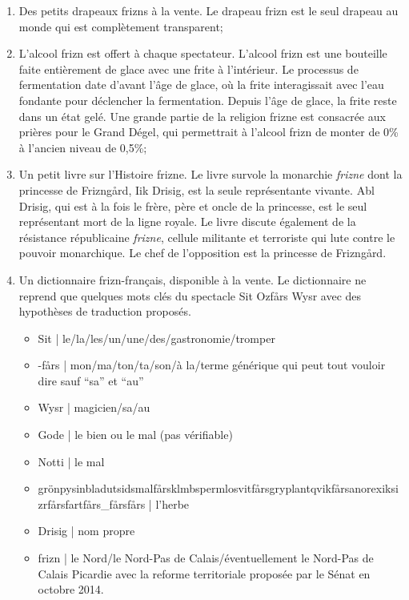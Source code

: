 \documentclass[a4paper]{article}
\begin{document}
\begin{enumerate}
\item Des petits drapeaux frizns à la vente. Le drapeau frizn est le seul
drapeau au monde qui est complètement transparent;
\item L’alcool frizn est offert à chaque spectateur. L'alcool frizn est une bouteille
faite entièrement de glace avec une frite à l'intérieur. Le processus de
fermentation date
d'avant l'âge de glace, où la frite interagissait avec l'eau fondante pour
déclencher la fermentation. Depuis l'âge de glace, la frite reste dans un
état gelé. Une grande partie de la religion frizne est consacrée aux prières
pour le Grand
Dégel, qui permettrait à l'alcool frizn de monter de 0\% à l'ancien
niveau de 0,5\%;
\item Un petit livre sur l'Histoire frizne. Le livre survole la monarchie \emph{frizne}
dont la princesse de Frizngård, Iik Drisig, est la seule représentante
vivante. Abl Drisig, qui est à la fois le frère, père et oncle de la princesse, est le seul
représentant mort de la ligne royale. Le livre discute également de la résistance républicaine
\emph{frizne}, cellule militante et terroriste qui lute contre le pouvoir
monarchique. Le chef de l'opposition est la princesse de Frizngård.
\item Un dictionnaire frizn-français, disponible à la vente. Le dictionnaire
ne reprend que quelques mots clés du spectacle Sit Ozfårs Wysr avec des
hypothèses de traduction proposés.
  \begin{itemize}
  \item Sit | le/la/les/un/une/des/gastronomie/tromper
  \item -fårs | mon/ma/ton/ta/son/à la/terme générique qui peut tout vouloir
  dire sauf ``sa'' et ``au''
  \item Wysr | magicien/sa/au
  \item Gode | le bien ou le mal (pas vérifiable)
  \item Notti | le mal
  \item grön\-pysin\-blad\-utsid\-smal\-fårs\-klmb\-sperm\-lo\-svit\-fårs\-gry\-plant\-qvik\-fårs\-anorexik\-sizr\-fårs\-fart\-fårs\-\_\-fårs\-fårs
  | l'herbe
  \item Drisig | nom propre
  \item frizn | le Nord/le Nord-Pas de Calais/éventuellement le Nord-Pas de
  Calais Picardie avec la reforme territoriale proposée par le Sénat en
  octobre 2014.
  \end{itemize}
\end{enumerate} \par
\end{document}
